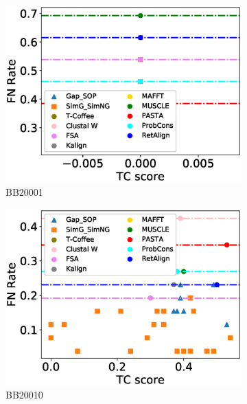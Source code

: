 \begin{figure}[!htbp]
	\centering
	\begin{adjustwidth}{-1.5cm}{-1cm}
		\begin{subfigure}{0.22\textwidth}
			\includegraphics[width=\columnwidth]{Figure/summary/precomputedInit/Balibase/BB20001_fnrate_vs_tc_2}
			\caption{BB20001}
		\end{subfigure}	
		\begin{subfigure}{0.22\textwidth}
			\includegraphics[width=\columnwidth]{Figure/summary/precomputedInit/Balibase/BB20010_fnrate_vs_tc_2}
			\caption{BB20010}
		\end{subfigure}
		\begin{subfigure}{0.22\textwidth}

\end{subfigure}
\end{adjustwidth}
\end{figure}
